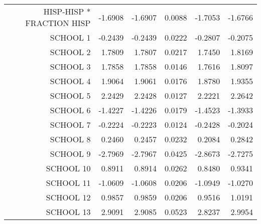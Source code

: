 \begin{table}[ht]
\begin{tabular}{rrrrrr}
  HISP-HISP * FRACTION HISP & -1.6908 & -1.6907 & 0.0088 & -1.7053 & -1.6766 \\ 
  SCHOOL 1 & -0.2439 & -0.2439 & 0.0222 & -0.2807 & -0.2075 \\ 
  SCHOOL 2 & 1.7809 & 1.7807 & 0.0217 & 1.7450 & 1.8169 \\ 
  SCHOOL 3 & 1.7858 & 1.7858 & 0.0146 & 1.7616 & 1.8097 \\ 
  SCHOOL 4 & 1.9064 & 1.9061 & 0.0176 & 1.8780 & 1.9355 \\ 
  SCHOOL 5 & 2.2429 & 2.2428 & 0.0127 & 2.2221 & 2.2642 \\ 
  SCHOOL 6 & -1.4227 & -1.4226 & 0.0179 & -1.4523 & -1.3933 \\ 
  SCHOOL 7 & -0.2224 & -0.2223 & 0.0124 & -0.2428 & -0.2024 \\ 
  SCHOOL 8 & 0.2460 & 0.2457 & 0.0232 & 0.2084 & 0.2842 \\ 
  SCHOOL 9 & -2.7969 & -2.7967 & 0.0425 & -2.8673 & -2.7275 \\ 
  SCHOOL 10 & 0.8911 & 0.8914 & 0.0262 & 0.8480 & 0.9341 \\ 
  SCHOOL 11 & -1.0609 & -1.0608 & 0.0206 & -1.0949 & -1.0270 \\ 
  SCHOOL 12 & 0.9857 & 0.9859 & 0.0206 & 0.9516 & 1.0191 \\ 
  SCHOOL 13 & 2.9091 & 2.9085 & 0.0523 & 2.8237 & 2.9954 \\ 
   \hline
\end{tabular}
\end{table}